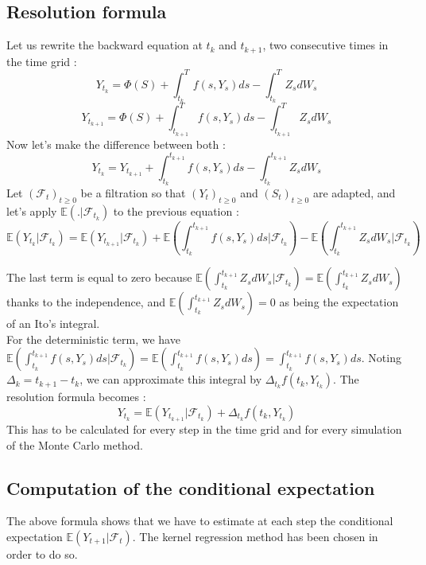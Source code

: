 \documentclass[a4paper,11pt,english]{book}
\begin{document}
\subsection{Resolution formula}
Let us rewrite the backward equation at $t_{k}$ and $t_{k+1}$, two consecutive times in the time grid :
$$Y_{t_{k}} = \Phi(S) + \int_{t_{k}}^{T} f(s,Y_{s}) ds - \int_{t_{k}}^{T} Z_{s} dW_{s}$$
$$Y_{t_{k+1}} = \Phi(S) + \int_{t_{k+1}}^{T} f(s,Y_{s}) ds - \int_{t_{k+1}}^{T} Z_{s} dW_{s}$$
Now let's make the difference between both :
$$Y_{t_{k}} = Y_{t_{k+1}} + \int_{t_{k}}^{t_{k+1}} f(s,Y_{s}) ds - \int_{t_{k}}^{t_{k+1}}Z_{s} dW_{s}$$
Let $(\mathcal{F}_{t})_{t\geq0}$ be a filtration so that $(Y_{t})_{t\geq0}$ and $(S_{t})_{t\geq0}$ are adapted, and let's apply $\mathbb{E}(.|\mathcal{F}_{t_{k}})$ to the previous equation :
$$\mathbb{E}(Y_{t_{k}}|\mathcal{F}_{t_{k}}) = \mathbb{E}(Y_{t_{k+1}}|\mathcal{F}_{t_{k}}) + \mathbb{E}(\int_{t_{k}}^{t_{k+1}} f(s,Y_{s}) ds|\mathcal{F}_{t_{k}}) - \mathbb{E}(\int_{t_{k}}^{t_{k+1}}Z_{s} dW_{s}|\mathcal{F}_{t_{k}})$$

The last term is equal to zero because $\mathbb{E}(\int_{t_{k}}^{t_{k+1}}Z_{s} dW_{s}|\mathcal{F}_{t_{k}})=\mathbb{E}(\int_{t_{k}}^{t_{k+1}}Z_{s} dW_{s})$ thanks to the independence, and $\mathbb{E}(\int_{t_{k}}^{t_{k+1}}Z_{s} dW_{s})=0$ as being the expectation of an Ito's integral.\\
For the deterministic term, we have $\mathbb{E}(\int_{t_{k}}^{t_{k+1}}f(s,Y_{s}) ds|\mathcal{F}_{t_{k}})=\mathbb{E}(\int_{t_{k}}^{t_{k+1}}f(s,Y_{s}) ds) = \int_{t_{k}}^{t_{k+1}}f(s,Y_{s}) ds$. Noting $\Delta_{k}=t_{k+1}-t_{k}$, we can approximate this integral by $\Delta_{t_{k}}f(t_{k},Y_{t_{k}})$.
The resolution formula becomes :
\begin{equation}
Y_{t_{k}} = \mathbb{E}(Y_{t_{k+1}}|\mathcal{F}_{t_{k}}) + \Delta_{t_{k}}f(t_{k},Y_{t_{k}})
\label{resolutionFormula}
\end{equation}
This has to be calculated for every step in the time grid and for every simulation of the Monte Carlo method.
\subsection{Computation of the conditional expectation}
\label{subsec:conditional-expectation}
The above formula shows that we have to estimate at each step the conditional expectation $\mathbb{E}(Y_{t+1}|\mathcal{F}_{t})$. The kernel regression method has been chosen in order to do so.\\
\end{document}
